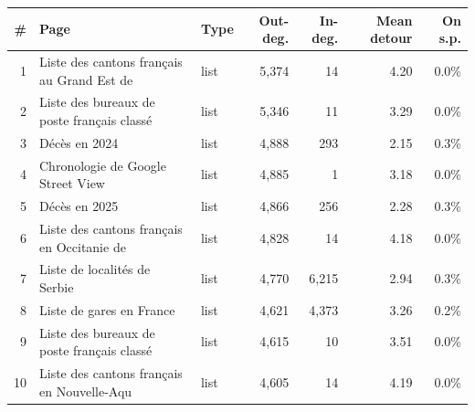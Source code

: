 \begin{tabular}{@{}rlp{1.5cm}rrrr@{}}
\toprule
\# & Page & Type & Out-deg. & In-deg. & Mean detour & On s.p. \\
\midrule
1 & Liste des cantons français au Grand Est de & list & 5{,}374 & 14 & 4.20 & 0.0\% \\
2 & Liste des bureaux de poste français classé & list & 5{,}346 & 11 & 3.29 & 0.0\% \\
3 & Décès en 2024 & list & 4{,}888 & 293 & 2.15 & 0.3\% \\
4 & Chronologie de Google Street View & list & 4{,}885 & 1 & 3.18 & 0.0\% \\
5 & Décès en 2025 & list & 4{,}866 & 256 & 2.28 & 0.3\% \\
6 & Liste des cantons français en Occitanie de & list & 4{,}828 & 14 & 4.18 & 0.0\% \\
7 & Liste de localités de Serbie & list & 4{,}770 & 6{,}215 & 2.94 & 0.3\% \\
8 & Liste de gares en France & list & 4{,}621 & 4{,}373 & 3.26 & 0.2\% \\
9 & Liste des bureaux de poste français classé & list & 4{,}615 & 10 & 3.51 & 0.0\% \\
10 & Liste des cantons français en Nouvelle-Aqu & list & 4{,}605 & 14 & 4.19 & 0.0\% \\
\bottomrule
\end{tabular}
